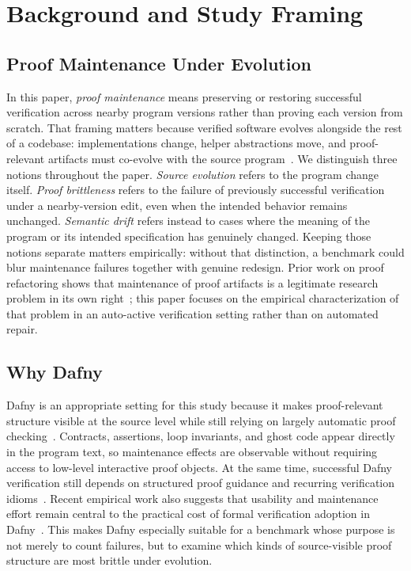 \section{Background and Study Framing}

\subsection{Proof Maintenance Under Evolution}

In this paper, \emph{proof maintenance} means preserving or restoring successful verification across nearby program versions rather than proving each version from scratch. That framing matters because verified software evolves alongside the rest of a codebase: implementations change, helper abstractions move, and proof-relevant artifacts must co-evolve with the source program~\cite{Zaidman2010CoEvolutionProductionTest}. We distinguish three notions throughout the paper. \emph{Source evolution} refers to the program change itself. \emph{Proof brittleness} refers to the failure of previously successful verification under a nearby-version edit, even when the intended behavior remains unchanged. \emph{Semantic drift} refers instead to cases where the meaning of the program or its intended specification has genuinely changed. Keeping those notions separate matters empirically: without that distinction, a benchmark could blur maintenance failures together with genuine redesign. Prior work on proof refactoring shows that maintenance of proof artifacts is a legitimate research problem in its own right~\cite{Whiteside2011ProofScriptRefactoring,Whiteside2013RefactoringProofs}; this paper focuses on the empirical characterization of that problem in an auto-active verification setting rather than on automated repair.

\subsection{Why Dafny}

Dafny is an appropriate setting for this study because it makes proof-relevant structure visible at the source level while still relying on largely automatic proof checking~\cite{Leino2010Dafny}. Contracts, assertions, loop invariants, and ghost code appear directly in the program text, so maintenance effects are observable without requiring access to low-level interactive proof objects. At the same time, successful Dafny verification still depends on structured proof guidance and recurring verification idioms~\cite{Grov2016VerificationPatternsDafny}. Recent empirical work also suggests that usability and maintenance effort remain central to the practical cost of formal verification adoption in Dafny~\cite{Mugnier2025ImpactVerification}. This makes Dafny especially suitable for a benchmark whose purpose is not merely to count failures, but to examine which kinds of source-visible proof structure are most brittle under evolution.

